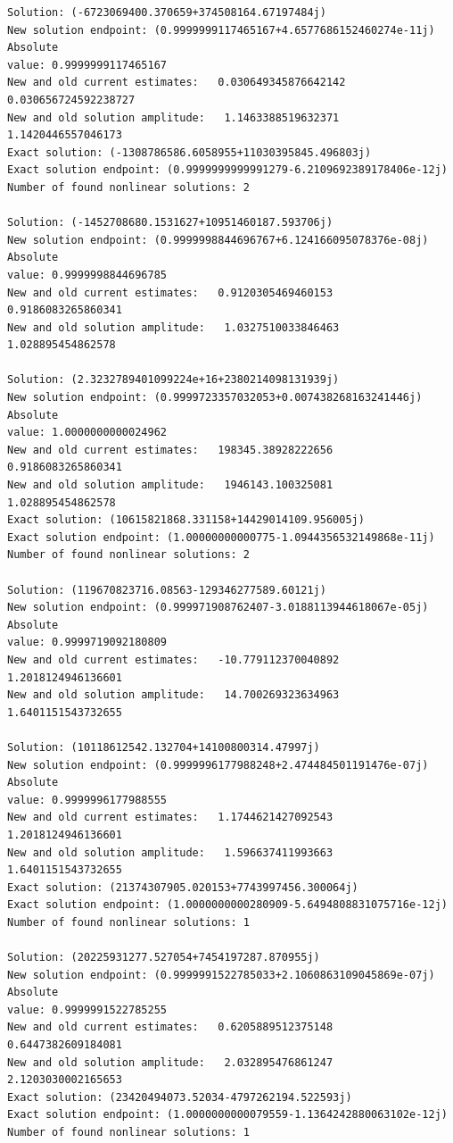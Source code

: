 \documentclass[11pt]{article}
\begin{document}
\begin{Verbatim}[commandchars=\\\{\}]
Solution: (-6723069400.370659+374508164.67197484j)
New solution endpoint: (0.9999999117465167+4.6577686152460274e-11j) Absolute
value: 0.9999999117465167
New and old current estimates:   0.030649345876642142    0.030656724592238727
New and old solution amplitude:   1.1463388519632371    1.1420446557046173
Exact solution: (-1308786586.6058955+11030395845.496803j)
Exact solution endpoint: (0.9999999999991279-6.2109692389178406e-12j)
Number of found nonlinear solutions: 2

Solution: (-1452708680.1531627+10951460187.593706j)
New solution endpoint: (0.9999998844696767+6.124166095078376e-08j) Absolute
value: 0.9999998844696785
New and old current estimates:   0.9120305469460153    0.9186083265860341
New and old solution amplitude:   1.0327510033846463    1.028895454862578

Solution: (2.3232789401099224e+16+2380214098131939j)
New solution endpoint: (0.9999723357032053+0.007438268163241446j) Absolute
value: 1.0000000000024962
New and old current estimates:   198345.38928222656    0.9186083265860341
New and old solution amplitude:   1946143.100325081    1.028895454862578
Exact solution: (10615821868.331158+14429014109.956005j)
Exact solution endpoint: (1.00000000000775-1.0944356532149868e-11j)
Number of found nonlinear solutions: 2

Solution: (119670823716.08563-129346277589.60121j)
New solution endpoint: (0.999971908762407-3.0188113944618067e-05j) Absolute
value: 0.9999719092180809
New and old current estimates:   -10.779112370040892    1.2018124946136601
New and old solution amplitude:   14.700269323634963    1.6401151543732655

Solution: (10118612542.132704+14100800314.47997j)
New solution endpoint: (0.9999996177988248+2.474484501191476e-07j) Absolute
value: 0.9999996177988555
New and old current estimates:   1.1744621427092543    1.2018124946136601
New and old solution amplitude:   1.596637411993663    1.6401151543732655
Exact solution: (21374307905.020153+7743997456.300064j)
Exact solution endpoint: (1.0000000000280909-5.6494808831075716e-12j)
Number of found nonlinear solutions: 1

Solution: (20225931277.527054+7454197287.870955j)
New solution endpoint: (0.9999991522785033+2.1060863109045869e-07j) Absolute
value: 0.9999991522785255
New and old current estimates:   0.6205889512375148    0.6447382609184081
New and old solution amplitude:   2.032895476861247    2.1203030002165653
Exact solution: (23420494073.52034-4797262194.522593j)
Exact solution endpoint: (1.0000000000079559-1.1364242880063102e-12j)
Number of found nonlinear solutions: 1


\end{Verbatim}
\end{document}
